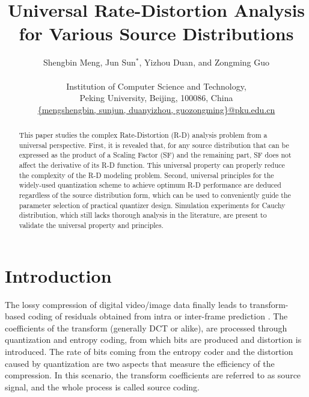 \documentclass[smallabstract,smallcaptions]{dccpaper}
\begin{document}
\title
{\large
\textbf{Universal Rate-Distortion Analysis for Various Source Distributions}
}

\author{%
Shengbin Meng, Jun Sun$^{\ast}$, Yizhou Duan, and Zongming Guo\\[0.5em]
{\small\begin{minipage}{\linewidth}\begin{center}
\begin{tabular}{ccc}
Institution of Computer Science and Technology, \\
Peking University, Beijing, 100086, China\\
\url{{mengshengbin, sunjun, duanyizhou, guozongming}@pku.edu.cn}
\end{tabular}
\end{center}\end{minipage}}
}

\maketitle
\thispagestyle{empty}

\begin{abstract}
This paper studies the complex Rate-Distortion (R-D) analysis problem from a universal perspective. First, it is revealed that, for any source distribution that can be expressed as the product of a Scaling Factor (SF) and the remaining part, SF does not affect the derivative of its R-D function. This universal property can properly reduce the complexity of the R-D modeling problem. Second, universal principles for the widely-used quantization scheme to achieve optimum R-D performance are deduced regardless of the source distribution form, which can be used to conveniently guide the parameter selection of practical quantizer design. Simulation experiments for Cauchy distribution, which still lacks thorough analysis in the literature, are present to validate the universal property and principles.
\end{abstract}

\section{Introduction}

\let\thefootnote\relax{}

The lossy compression of digital video/image data finally leads to transform-based coding of residuals obtained from intra or inter-frame prediction \cite{Sullivan_IEEE2005}. The coefficients of the transform (generally DCT or alike), are processed through quantization and entropy coding, from which bits are produced and distortion is introduced. The rate of bits coming from the entropy coder and the distortion caused by quantization are two aspects that measure the efficiency of the compression. In this scenario, the transform coefficients are referred to as source signal, and the whole process is called source coding.
\end{document}
